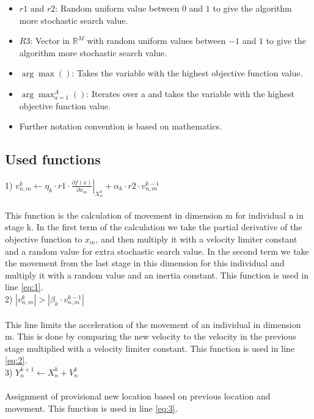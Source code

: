 \documentclass[runningheads]{llncs}
\begin{document}
\begin{itemize}
    \item $ r1 $ and $r2 $: Random uniform value between $ 0 $ and $ 1$ to give the algorithm more stochastic search value.
    \item $ R3 $: Vector in $\mathds{R}^M$ with random uniform values between $ -1 $ and $ 1$ to give the algorithm more stochastic search value.
    \item $\arg \max() $: Takes the variable with the highest objective function value.
    \item $\arg \max_{a=1}^A()$: Iterates over a and takes the variable with the highest objective function value.
    \item Further notation convention is based on mathematics.
\end{itemize}

\subsection{Used functions}

1) $
v_{n,m}^k \leftarrow \eta _k \cdot r1 \cdot  \left. \frac{\partial f(x)}{\partial x_m} \right \rvert_{X_{n}^k} + \alpha_k \cdot r2 \cdot v_{n,m}^{k-1}
$ \\ \\
This function is the calculation of movement in dimension m for individual n in stage k. In the first term of the calculation we take the partial derivative of the objective function to $x_m$, and then multiply it with a velocity limiter constant and a random value for extra stochastic search value. In the second term we take the movement from the last stage in this dimension for this individual and multiply it with a random value and an inertia constant. This function is used in line \ref{eq:1}. \\ 

2) $
\left \lvert v_{n,m}^k \right \rvert  > \left \lvert \beta_k \cdot v_{n,m}^{k-1} \right \rvert
$ \\ \\
This line limits the acceleration of the movement of an individual in dimension m. This is done by comparing the new velocity to the velocity in the previous stage multiplied with a velocity limiter constant. This function is used in line \ref{eq:2}. \\ 

3) $
Y_n^{k+1} \leftarrow X_n^k + V_n^k
$ \\ \\
Assignment of provisional new location based on previous location and movement. This function is used in line \ref{eq:3}. \\ 
\end{document}
